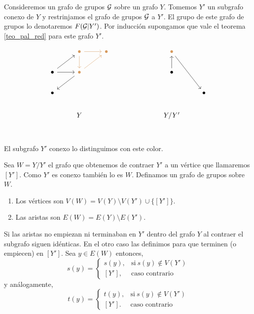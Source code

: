 \documentclass[tesis.tex]{subfiles}
\begin{document}
Consideremos un grafo de grupos ${\cal G}$ sobre un grafo $Y$. 
Tomemos $Y'$ un subgrafo conexo de $Y$ y restrinjamos el grafo de grupos ${\cal G}$ a $Y'$. 
El grupo de este grafo de grupos lo denotaremos $F({\cal G} | Y')$.
Por inducción supongamos que vale el teorema \ref{teo_pal_red} para este grafo $Y'$.

\[\begin{tikzcd}
	& \color{rgb,255:red,214;green,153;blue,92}\bullet &  \color{rgb,255:red,214;green,153;blue,92} \bullet &&&  \color{rgb,255:red,214;green,153;blue,92} \bullet \\
	\bullet & \color{rgb,255:red,214;green,153;blue,92} \bullet &&&& \bullet \\
	\bullet &&&&&& \bullet \\
	& Y &&&& Y/Y' \\ 	
	\arrow[color={rgb,255:red,214;green,153;blue,92}, from=1-2, to=1-3]
	\arrow[color={rgb,255:red,214;green,153;blue,92}, from=1-2, to=2-2]
	\arrow[color={rgb,255:red,214;green,153;blue,92}, from=2-2, to=1-3]
	\arrow[from=2-1, to=1-2]
	\arrow[from=2-1, to=2-2]
	\arrow[from=2-2, to=3-1]
	\arrow[from=1-6, to=3-7]
	\arrow[from=2-6, to=1-6]
\end{tikzcd}\]
El subgrafo $Y'$ conexo lo distinguimos con este \textcolor{rgb,255:red,214;green,153;blue,92}{color}.

Sea $W = Y / Y'$  el grafo que obtenemos de contraer $Y'$ a un vértice que llamaremos $[Y']$. 
Como $Y'$ es conexo también lo es $W$.
Definamos un grafo de grupos sobre $W$.

\begin{enumerate}
	\item Los vértices son $V(W)= V(Y) \setminus V(Y') \cup \{ [Y'] \}$.
	\item Las aristas son $E(W) = E(Y) \setminus E(Y')$.
\end{enumerate}

Si las aristas no empiezan ni terminaban en $Y'$ dentro del grafo $Y$ al contraer el subgrafo siguen idénticas. 
En el otro caso las definimos para que terminen (o empiecen) en $[Y']$. Sea $y \in E(W)$ entonces,
\begin{equation*}
	s(y) = 
	\begin{cases}
	s(y),  & \text{si} \ s(y) \notin V(Y') \\ 
	[Y'], & \text{caso contrario}
	\end{cases}
\end{equation*}
y análogamente,
\begin{equation*}
	t(y) = 
	\begin{cases}
		t(y),  & \text{si} \ s(y) \notin V(Y') \\ 
		[Y']. & \text{caso contrario}
	\end{cases}
\end{equation*}
\end{document}
